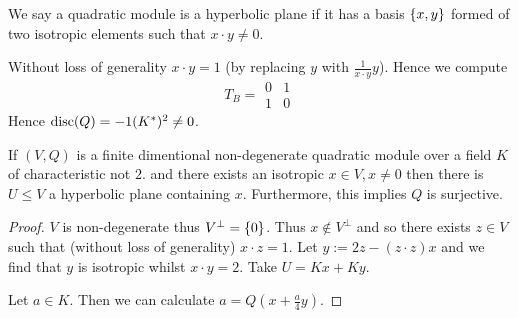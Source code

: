 \begin{dfn}
    We say a quadratic module is a hyperbolic plane if
    it has a basis $\left\{x,y\right\}$ 
    formed of two isotropic elements such that
    $x \cdot y \ne 0$.

    Without loss of generality $x \cdot y = 1$ 
    (by replacing $y$ with $\frac{1}{x \cdot y} y$).
    Hence we compute 
    \[T_B = \begin{matrix}
        0 & 1 \\
        1 & 0
    \end{matrix}\]
    Hence 
    $\mathrm{disc}(Q) = - 1 (K^*)^2 \ne 0$.
\end{dfn}

\begin{prop}
    If $(V,Q)$ is a finite dimentional 
    non-degenerate quadratic module over a field $K$
    of characteristic not $2$.
    and there exists an isotropic $ x \in V, x \ne 0 $
    then there is $U \le V$ a hyperbolic plane containing $x$.
    Furthermore, 
    this implies $Q$ is surjective.
\end{prop}
\begin{proof}
    $V$ is non-degenerate thus $V^\bot = \left\{0\right\}$.
    Thus $x \notin V^\bot$ and so there exists $z \in V$
    such that (without loss of generality) $x \cdot z = 1$.
    Let $y := 2z - (z \cdot z) x$ and we find that $y$ is isotropic
    whilst $x \cdot y = 2$.
    Take $U = K x + K y$.

    Let $a \in K$.
    Then we can calculate $a = Q(x + \frac{a}{4} y)$. 
\end{proof}


